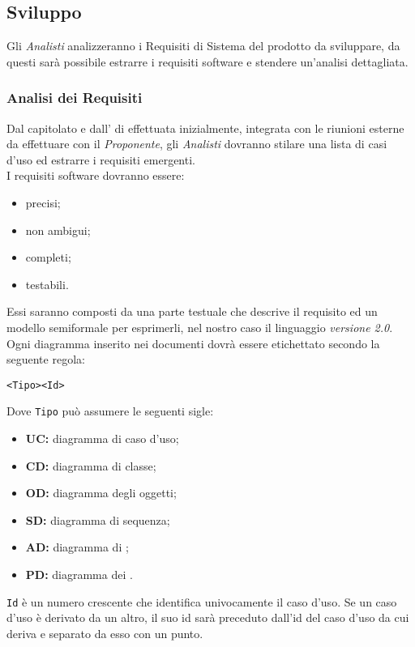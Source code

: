 \documentclass{scalatekids-article}
\begin{document}
\subsection{Sviluppo}

Gli \textit{Analisti} analizzeranno i Requisiti di Sistema del prodotto da
sviluppare, da questi sarà possibile estrarre i requisiti software e stendere un'analisi dettagliata.

\subsubsection{Analisi dei Requisiti}

Dal capitolato e dall' di  effettuata
inizialmente, integrata con le riunioni esterne da effettuare con il
\textit{Proponente}, gli \textit{Analisti} dovranno stilare una lista di casi
d'uso ed estrarre i requisiti emergenti.\\
I requisiti software dovranno essere:
\begin{itemize}
    \item precisi;
    \item non ambigui;
    \item completi;
    \item testabili.
\end{itemize}
Essi saranno composti da una parte testuale che descrive il requisito ed un
modello semiformale per esprimerli, nel nostro caso il linguaggio 
\textit{versione 2.0}. Ogni diagramma inserito nei documenti dovrà essere
etichettato secondo la seguente regola:
\begin{center}
    \verb=<Tipo><Id>=
\end{center}
Dove \verb=Tipo= può assumere le seguenti sigle:
\begin{itemize}
    \item\textbf{UC:} diagramma di caso d'uso;
    \item\textbf{CD:} diagramma di classe;
    \item\textbf{OD:} diagramma degli oggetti;
    \item\textbf{SD:} diagramma di sequenza;
    \item\textbf{AD:} diagramma di ;
    \item\textbf{PD:} diagramma dei .
\end{itemize}
\verb=Id= è un numero crescente che identifica
univocamente il caso d'uso. Se un caso d'uso è derivato da un altro, il suo id
sarà preceduto dall'id del caso d'uso da cui deriva e separato da esso con un
punto.
\end{document}
